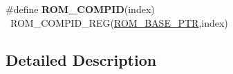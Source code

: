 \begin{DoxyCompactItemize}
\item 
\hypertarget{group___r_o_m___register___accessor___macros_ga6238d799bb485f4ae8bf36985004c16b}{}\#define {\bfseries R\+O\+M\+\_\+\+C\+O\+M\+P\+I\+D}(index)                                            ~R\+O\+M\+\_\+\+C\+O\+M\+P\+I\+D\+\_\+\+R\+E\+G(\hyperlink{group___r_o_m___peripheral_ga5ad426d10b6832ca7012e8767113f686}{R\+O\+M\+\_\+\+B\+A\+S\+E\+\_\+\+P\+T\+R},index)\label{group___r_o_m___register___accessor___macros_ga6238d799bb485f4ae8bf36985004c16b}

\end{DoxyCompactItemize}


\subsection{Detailed Description}
